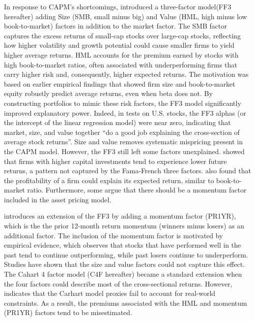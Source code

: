 In response to CAPM's shortcomings,  introduced a three-factor model(FF3 hereafter) adding Size (SMB, small minus big) and Value (HML, high minus low book-to-market) factors in addition to the market factor. The SMB factor captures the excess returns of small-cap stocks over large-cap stocks, reflecting how higher volatility and growth potential could cause smaller firms to yield higher average returns. HML accounts for the premium earned by stocks with high book-to-market ratios, often associated with underperforming firms that carry higher risk and, consequently, higher expected returns. The motivation was based on earlier empirical findings that showed firm size and book-to-market equity robustly predict average returns, even when beta does not. By constructing portfolios to mimic these risk factors, the FF3 model significantly improved explanatory power. Indeed, in tests on U.S. stocks, the FF3 alphas (or the intercept of the linear regression model) were near zero, indicating that market, size, and value together “do a good job explaining the cross-section of average stock returns”. Size and value removes systematic mispricing present in the CAPM model. However, the FF3 still left some factors unexplained.  showed that firms with higher capital investments tend to experience lower future returns, a pattern not captured by the Fama-French three factors.  also found that the profitability of a firm could explain its expected return, similar to book-to-market ratio. Furthermore, some argue that there should be a momentum factor included in the asset pricing model.

 introduces an extension of the FF3 by adding a momentum factor (PR1YR), which is the  the prior 12-month return momentum (winners minus losers) as an additional factor. The inclusion of the momentum factor is motivated by empirical evidence, which observes that stocks that have performed well in the past tend to continue outperforming, while past losers continue to underperform. Studies have shown that the size and value factors could not capture this effect. The Cahart 4 factor model (C4F hereafter) became a standard extension when the four factors could describe most of the cross-sectional returns. However,  indicates that the Carhart model proxies fail to account for real-world constraints. As a result, the premiums associated with the HML and momentum (PR1YR) factors tend to be misestimated.

